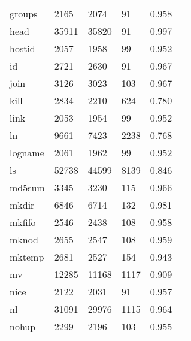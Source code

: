 \begin{longtable}{lp{2.40cm}p{2.40cm}p{2.40cm}p{2.40cm}p{2.40cm}}
groups    &                     2165 &         2074 &            91 &                    0.958 \\
head      &                    35911 &        35820 &            91 &                    0.997 \\
hostid    &                     2057 &         1958 &            99 &                    0.952 \\
id        &                     2721 &         2630 &            91 &                    0.967 \\
join      &                     3126 &         3023 &           103 &                    0.967 \\
kill      &                     2834 &         2210 &           624 &                    0.780 \\
link      &                     2053 &         1954 &            99 &                    0.952 \\
ln        &                     9661 &         7423 &          2238 &                    0.768 \\
logname   &                     2061 &         1962 &            99 &                    0.952 \\
ls        &                    52738 &        44599 &          8139 &                    0.846 \\
md5sum    &                     3345 &         3230 &           115 &                    0.966 \\
mkdir     &                     6846 &         6714 &           132 &                    0.981 \\
mkfifo    &                     2546 &         2438 &           108 &                    0.958 \\
mknod     &                     2655 &         2547 &           108 &                    0.959 \\
mktemp    &                     2681 &         2527 &           154 &                    0.943 \\
mv        &                    12285 &        11168 &          1117 &                    0.909 \\
nice      &                     2122 &         2031 &            91 &                    0.957 \\
nl        &                    31091 &        29976 &          1115 &                    0.964 \\
nohup     &                     2299 &         2196 &           103 &                    0.955 \\

\end{longtable}
